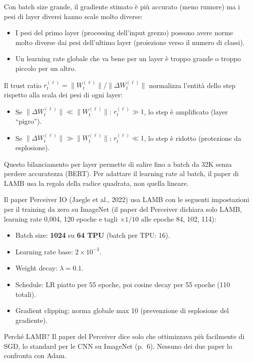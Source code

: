 \documentclass[
  11pt,
]{article}
\begin{document}
\begin{notabox}[title={\textbf{Perché il trust ratio abilita il large batch training?}}]
Con batch size grande, il gradiente stimato è più accurato (meno rumore) ma i pesi di layer diversi hanno scale molto diverse:
\begin{itemize}
  \item I pesi del primo layer (processing dell'input grezzo) possono avere norme molto diverse dai pesi dell'ultimo layer (proiezione verso il numero di classi).
  \item Un learning rate globale che va bene per un layer è troppo grande o troppo piccolo per un altro.
\end{itemize}
Il trust ratio $r_t^{(\ell)} = \|W_t^{(\ell)}\| / \|\Delta W_t^{(\ell)}\|$ normalizza l'entità dello step rispetto alla scala dei pesi di ogni layer:
\begin{itemize}
  \item Se $\|\Delta W_t^{(\ell)}\| \ll \|W_t^{(\ell)}\|$: $r_t^{(\ell)} \gg 1$, lo step è amplificato (layer ``pigro'').
  \item Se $\|\Delta W_t^{(\ell)}\| \gg \|W_t^{(\ell)}\|$: $r_t^{(\ell)} \ll 1$, lo step è ridotto (protezione da esplosione).
\end{itemize}
Questo bilanciamento per layer permette di salire fino a batch da 32K senza perdere accuratezza (BERT). Per adattare il learning rate al batch, il paper di LAMB usa la regola della radice quadrata, non quella lineare.
\end{notabox}

\begin{notabox}[title={\textbf{LAMB nel Perceiver IO}}]
Il paper Perceiver IO (Jaegle et al., 2022) usa LAMB con le seguenti impostazioni per il training da zero su ImageNet (il paper del Perceiver dichiara solo LAMB, learning rate 0{,}004, 120 epoche e tagli $\times 1/10$ alle epoche 84, 102, 114):
\begin{itemize}
  \item Batch size: \textbf{1024} su \textbf{64 TPU} (batch per TPU: 16).
  \item Learning rate base: $2 \times 10^{-3}$.
  \item Weight decay: $\lambda = 0.1$.
  \item Schedule: LR piatto per 55 epoche, poi cosine decay per 55 epoche (110 totali).
  \item Gradient clipping: norma globale max 10 (prevenzione di esplosione del gradiente).
\end{itemize}
Perché LAMB? Il paper del Perceiver dice solo che ottimizzava più facilmente di SGD, lo standard per le CNN su ImageNet (p.~6). Nessuno dei due paper lo confronta con Adam.
\end{notabox}
\end{document}
